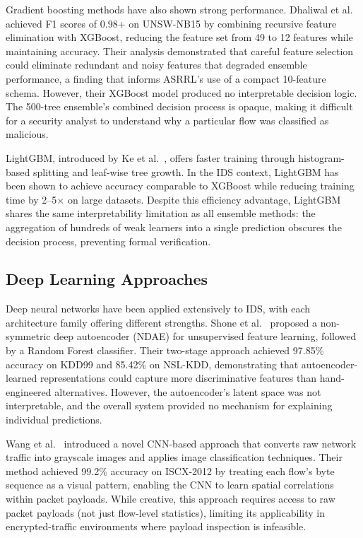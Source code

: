 \documentclass[12pt, letterpaper, oneside]{report}
\newcommand{\ASRRL}{\textsc{ASRRL}}
\begin{document}
Gradient boosting methods have also shown strong performance. Dhaliwal et al.~\citep{dhaliwal2018} achieved F1 scores of 0.98+ on UNSW-NB15 by combining recursive feature elimination with XGBoost, reducing the feature set from 49 to 12 features while maintaining accuracy. Their analysis demonstrated that careful feature selection could eliminate redundant and noisy features that degraded ensemble performance, a finding that informs \ASRRL{}'s use of a compact 10-feature schema. However, their XGBoost model produced no interpretable decision logic. The 500-tree ensemble's combined decision process is opaque, making it difficult for a security analyst to understand why a particular flow was classified as malicious.

LightGBM, introduced by Ke et al.~\citep{ke2017}, offers faster training through histogram-based splitting and leaf-wise tree growth. In the IDS context, LightGBM has been shown to achieve accuracy comparable to XGBoost while reducing training time by 2--5$\times$ on large datasets. Despite this efficiency advantage, LightGBM shares the same interpretability limitation as all ensemble methods: the aggregation of hundreds of weak learners into a single prediction obscures the decision process, preventing formal verification.

\subsection{Deep Learning Approaches}

Deep neural networks have been applied extensively to IDS, with each architecture family offering different strengths. Shone et al.~\citep{shone2018} proposed a non-symmetric deep autoencoder (NDAE) for unsupervised feature learning, followed by a Random Forest classifier. Their two-stage approach achieved 97.85\% accuracy on KDD99 and 85.42\% on NSL-KDD, demonstrating that autoencoder-learned representations could capture more discriminative features than hand-engineered alternatives. However, the autoencoder's latent space was not interpretable, and the overall system provided no mechanism for explaining individual predictions.

Wang et al.~\citep{wang2017} introduced a novel CNN-based approach that converts raw network traffic into grayscale images and applies image classification techniques. Their method achieved 99.2\% accuracy on ISCX-2012 by treating each flow's byte sequence as a visual pattern, enabling the CNN to learn spatial correlations within packet payloads. While creative, this approach requires access to raw packet payloads (not just flow-level statistics), limiting its applicability in encrypted-traffic environments where payload inspection is infeasible.
\end{document}
